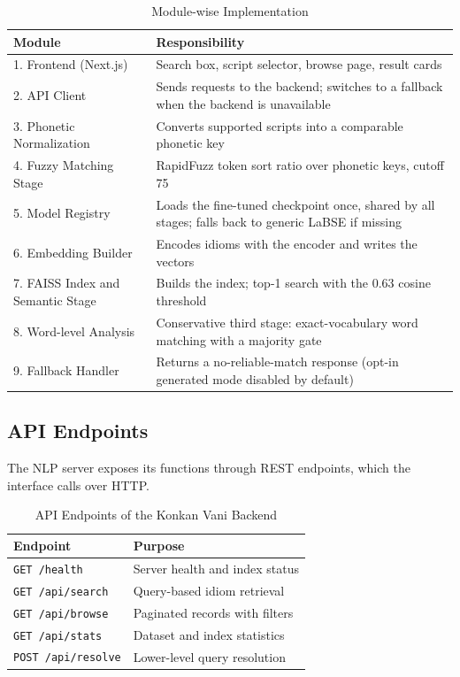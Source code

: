 \documentclass[12pt,a4paper]{article}
\begin{document}
\begin{table}[H]
\centering
\caption{Module-wise Implementation}
\label{tab:modules}
\renewcommand{\arraystretch}{1.3}
\begin{tabularx}{\linewidth}{|l|X|}
\hline
\textbf{Module} & \textbf{Responsibility} \\
\hline
1. Frontend (Next.js) & Search box, script selector, browse page, result cards \\
\hline
2. API Client & Sends requests to the backend; switches to a fallback when the backend is unavailable \\
\hline
3. Phonetic Normalization & Converts supported scripts into a comparable phonetic key \\
\hline
4. Fuzzy Matching Stage & RapidFuzz token sort ratio over phonetic keys, cutoff 75 \\
\hline
5. Model Registry & Loads the fine-tuned checkpoint once, shared by all stages; falls back to generic LaBSE if missing \\
\hline
6. Embedding Builder & Encodes idioms with the encoder and writes the vectors \\
\hline
7. FAISS Index and Semantic Stage & Builds the index; top-1 search with the 0.63 cosine threshold \\
\hline
8. Word-level Analysis & Conservative third stage: exact-vocabulary word matching with a majority gate \\
\hline
9. Fallback Handler & Returns a no-reliable-match response (opt-in generated mode disabled by default) \\
\hline
\end{tabularx}
\end{table}

\subsection{API Endpoints}
The NLP server exposes its functions through REST endpoints, which the interface calls over HTTP.

\begin{table}[H]
\centering
\caption{API Endpoints of the Konkan Vani Backend}
\label{tab:endpoints}
\renewcommand{\arraystretch}{1.3}
\begin{tabularx}{\linewidth}{|l|X|}
\hline
\textbf{Endpoint} & \textbf{Purpose} \\
\hline
\texttt{GET /health} & Server health and index status \\
\hline
\texttt{GET /api/search} & Query-based idiom retrieval \\
\hline
\texttt{GET /api/browse} & Paginated records with filters \\
\hline
\texttt{GET /api/stats} & Dataset and index statistics \\
\hline
\texttt{POST /api/resolve} & Lower-level query resolution \\
\hline
\end{tabularx}
\end{table}
\end{document}
